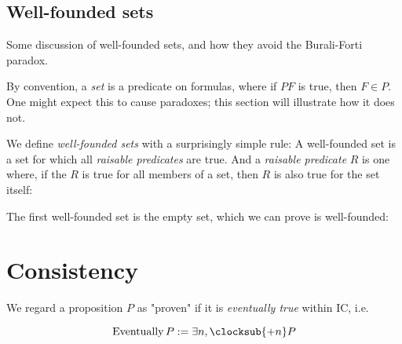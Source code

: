\documentclass{article}
\begin{document}
\iffalse
  \subsection{Well-founded sets}

  Some discussion of well-founded sets, and how they avoid the Burali-Forti paradox.

  By convention, a \emph{set} is a predicate on formulas, where if $PF$ is true, then $F \in P$. One might expect this to cause paradoxes; this section will illustrate how it does not.

  We define \emph{well-founded sets} with a surprisingly simple rule: A well-founded set is a set for which all \emph{raisable predicates} are true. And a \emph{raisable predicate} $R$ is one where, if the $R$ is true for all members of a set, then $R$ is also true for the set itself:


  The first well-founded set is the empty set, which we can prove is well-founded:
  
%
%
%
%

  \section{Consistency}\label{consistency}
  
  We regard a proposition $P$ as "proven" if it is \emph{eventually true} within IC, i.e.
  
  \newcommand{\eventually}{\operatorname{\mathrm{Eventually}}}
  
  \[ \eventually P := \exists n, \clocksub{+n} P \]
  
\end{document}
